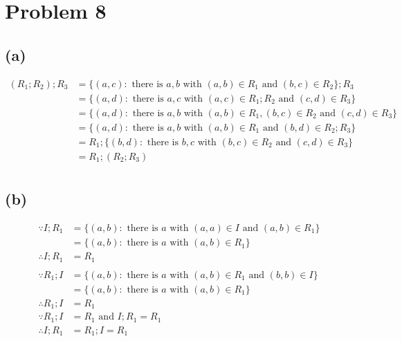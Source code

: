 \documentclass{article} %
\begin{document}
\section*{Problem 8}
\subsection*{(a)}
\[\begin{array}{rlcr}
(R_{1};R_{2});R_{3}	&=\{(a,c):\mbox{ there is }a,b\mbox{ with }(a,b)\in R_{1}\mbox{ and }(b,c)\in R_{2}\};R_{3}\\
					&=\{(a,d):\mbox{ there is }a,c\mbox{ with }(a,c)\in R_{1};R_{2}\mbox{ and }(c,d)\in R_{3} \}\\
					&=\{(a,d):\mbox{ there is }a,b\mbox{ with }(a,b)\in R_{1},(b,c)\in R_{2}\mbox{ and }(c,d)\in R_{3}\}\\
					&=\{(a,d):\mbox{ there is }a,b\mbox{ with }(a,b)\in R_{1}\mbox{ and }(b,d)\in R_{2};R_{3} \}\\
					&=R_{1};\{(b,d):\mbox{ there is }b,c\mbox{ with }(b,c)\in R_{2}\mbox{ and }(c,d)\in R_{3}\}\\
					&=R_{1};(R_{2};R_{3})\\
\end{array}\]
\subsection*{(b)}
\[\begin{array}{rlcr}
\because I;R_{1}&=\{(a,b):\mbox{ there is }a\mbox{ with }(a,a)\in I\mbox{ and }(a,b)\in R_{1}\}\\
				&=\{(a,b):\mbox{ there is }a\mbox{ with }(a,b)\in R_{1}\}\\
\therefore I;R_{1}&=R_{1}\\
\\
\because R_{1};I&=\{(a,b):\mbox{ there is }a\mbox{ with }(a,b)\in R_{1}\mbox{ and }(b,b)\in I\}\\
				&=\{(a,b):\mbox{ there is }a\mbox{ with }(a,b)\in R_{1}\}\\
\therefore R_{1};I&=R_{1}\\
\because R_{1};I&=R_{1}\mbox{ and }I;R_{1}=R_{1}\\
\therefore I;R_{1}&=R_{1};I=R_{1}\\
\end{array}\]
\end{document}

